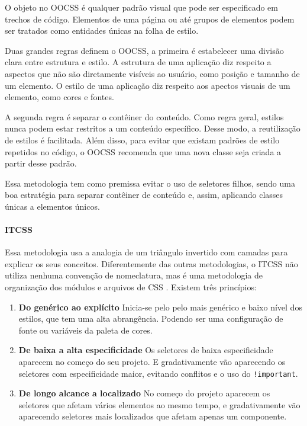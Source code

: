 O objeto no OOCSS é qualquer padrão visual que pode ser especificado em
trechos de código. Elementos de uma página ou até grupos de elementos
podem ser tratados como entidades únicas na folha de estilo.

Duas grandes regras definem o OOCSS, a primeira é estabelecer uma
divisão clara entre estrutura e estilo. A estrutura de uma aplicação diz
respeito a aspectos que não são diretamente visíveis ao usuário, como
posição e tamanho de um elemento. O estilo de uma aplicação diz respeito
aos apectos visuais de um elemento, como cores e fontes.


A segunda regra é separar o contêiner do conteúdo. Como regra geral, estilos nunca podem estar restritos a um conteúdo específico. Desse modo, a reutilização de estilos é facilitada. Além disso, para evitar que existam padrões de estilo repetidos no código, o OOCSS recomenda que uma nova classe seja criada a partir desse padrão.

Essa metodologia tem como premissa evitar o uso de seletores filhos, sendo uma boa estratégia para separar contêiner de conteúdo e, assim, aplicando classes únicas a elementos únicos.

\hypertarget{itcss}{%
\paragraph{ITCSS}\label{itcss}}

Essa metodologia usa a analogia de um triângulo invertido com camadas
para explicar os seus conceitos. Diferentemente das outras metodologias,
o ITCSS não utiliza nenhuma convenção de nomeclatura, mas é uma metodologia de organização dos módulos e arquivos de CSS \cite{itcss}. Existem três
princípios:

\begin{enumerate}
\def\labelenumi{\arabic{enumi}.}
\tightlist
\item
  \textbf{Do genérico ao explícito} Inicia-se pelo pelo mais genérico e
  baixo nível dos estilos, que tem uma alta abrangência. Podendo ser uma
  configuração de fonte ou variáveis da paleta de cores.
\item
  \textbf{De baixa a alta especificidade} Os seletores de baixa
  especificidade aparecem no começo do seu projeto. E gradativamente vão
  aparecendo os seletores com especificidade maior, evitando conflitos e
  o uso do \texttt{!important}.
\item
  \textbf{De longo alcance a localizado} No começo do projeto aparecem
  os seletores que afetam vários elementos ao mesmo tempo, e
  gradativamente vão aparecendo seletores mais localizados que afetam
  apenas um componente.
\end{enumerate}

